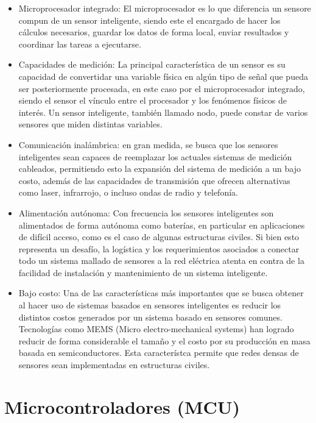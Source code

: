 \begin{itemize}
    \item Microprocesador integrado: El microprocesador es lo que diferencia un sensore compun de un sensor inteligente, siendo este el encargado de hacer los cálculos necesarios, guardar los datos de forma local, enviar resultados y coordinar las tareas a ejecutarse. 
    
    \item Capacidades de medición: La principal característica de un sensor es su capacidad de convertidar una variable física en algún tipo de señal que pueda ser posteriormente procesada, en este caso por el microprocesador integrado, siendo el sensor el vínculo entre el procesador y los fenómenos físicos de interés. Un sensor inteligente, también llamado nodo, puede constar de varios sensores que miden distintas variables.
    
    \item Comunicación inalámbrica: en gran medida, se busca que los sensores inteligentes sean capaces de reemplazar los actuales sistemas de medición cableados, permitiendo esto la expansión del sistema de medición a un bajo costo, además de las capacidades de transmisión que ofrecen alternativas como laser, infrarrojo, o incluso ondas de radio y telefonía.
    
    \item Alimentación autónoma: Con frecuencia los sensores inteligentes son alimentados de forma autónoma como baterías, en particular en aplicaciones de difícil acceso, como es el caso de algunas estructuras civiles. Si bien esto representa un desafío, la logística y los requerimientos asociados a conectar todo un sistema mallado de sensores a la red eléctrica atenta en contra de la facilidad de instalación y mantenimiento de un sistema inteligente.
    
    \item Bajo costo: Una de las características más importantes que se busca obtener al hacer uso de sistemas basados en sensores inteligentes es reducir los distintos costos generados por un sistema basado en sensores comunes. Tecnologías como MEMS (Micro electro-mechanical systems) han logrado reducir de forma considerable el tamaño y el costo por su producción en masa basada en semiconductores. Esta característca permite que redes densas de sensores sean implementadas en estructuras civiles.
\end{itemize}



\section{Microcontroladores (MCU)}

